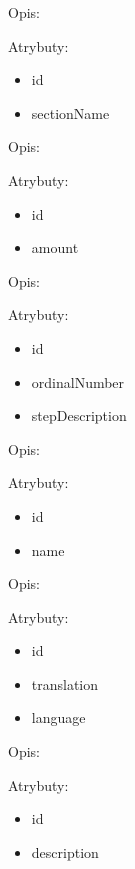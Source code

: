 \begin{enumerate}[label={\textbf{KAT/\protect\threedigits{\theenumi}}}, wide, labelwidth=!, labelindent=0pt, series=reqs]
     \label{kat:RecipeSection}

    Opis: \lipsum[1]
    \par
    Atrybuty:
    \begin{itemize}
        \item id
        \item sectionName
    \end{itemize}

     \label{kat:ProductPortion}

    Opis: \lipsum[1]
    \par
    Atrybuty:
    \begin{itemize}
        \item id
        \item amount
    \end{itemize}

     \label{kat:PreparationStep}

    Opis: \lipsum[1]
    \par
    Atrybuty:
    \begin{itemize}
        \item id
        \item ordinalNumber
        \item stepDescription
    \end{itemize}

     \label{kat:KitchenAppliance}

    Opis: \lipsum[1]
    \par
    Atrybuty:
    \begin{itemize}
        \item id
        \item name
    \end{itemize}

     \label{kat:KitchenApplianceTranslation}

    Opis: \lipsum[1]
    \par
    Atrybuty:
    \begin{itemize}
        \item id
        \item translation
        \item language
    \end{itemize}

     \label{kat:DishType}

    Opis: \lipsum[1]
    \par
    Atrybuty:
    \begin{itemize}
        \item id
        \item description
    \end{itemize}


\end{enumerate}
